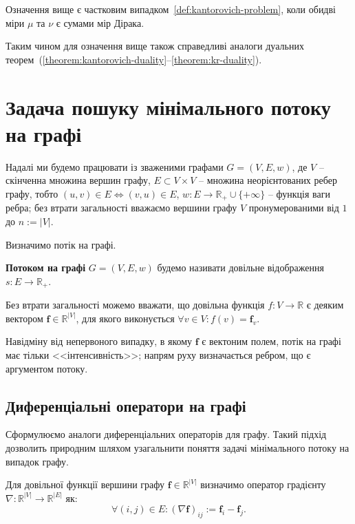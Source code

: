 Означення вище є частковим випадком~\ref{def:kantorovich-problem}, коли обидві міри $\mu$ та $\nu$ є
сумами мір Дірака.

Таким чином для означення вище також справедливі аналоги дуальних теорем~(\ref{theorem:kantorovich-duality}--\ref{theorem:kr-duality}).

\section{Задача пошуку мінімального потоку на графі}

Надалі ми будемо працювати із зваженими графами $G = (V, E, w)$, де $V$ -- скінченна множина вершин графу,
$E \subset V \times V$ -- множина неорієнтованих ребер графу, тобто $(u, v) \in E \iff (v, u) \in E$, 
$w : E \to \mathbb{R}_+ \cup \{+\infty\}$ -- функція ваги ребра;
без втрати загальності вважаємо вершини графу $V$ пронумерованими від $1$ до $n := |V|$.

Визначимо потік на графі.
\begin{definition}
    \textbf{Потоком на графі} $G = (V, E, w)$ будемо називати довільне відображення $s : E \to \mathbb{R}_+$.
\end{definition}

Без втрати загальності можемо вважати, що довільна функція $f : V \to \mathbb{R}$ 
є деяким вектором $\mathbf{f} \in \mathbb{R}^{|V|}$, для якого виконується $\forall v \in V: f(v) = \mathbf{f}_v$.

Навідміну від непервоного випадку, в якому $\mathbf{f}$ є вектоним полем, потік на графі має тільки <<інтенсивність>>; напрям руху
визначається ребром, що є аргументом потоку.

\subsection{Диференціальні оператори на графі}
Сформулюємо аналоги диференціальних операторів для графу. Такий підхід дозволить природним шляхом узагальнити поняття
задачі мінімального потоку на випадок графу.

\begin{definition}
    \label{def:grad}
    Для довільної функції вершини графу $\mathbf f \in \mathbb{R}^{|V|}$ визначимо оператор градієнту
    $\nabla : \mathbb{R}^{|V|} \to \mathbb{R}^{|E|}$ як:
    $$
        \forall (i, j) \in E: (\nabla \mathbf f)_{ij} := \mathbf{f}_i - \mathbf{f}_j.
    $$
\end{definition}


